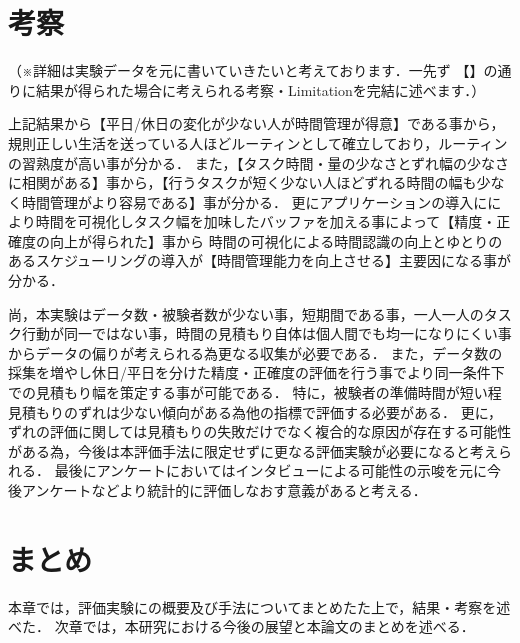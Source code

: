 
\section{考察}
（※詳細は実験データを元に書いていきたいと考えております．一先ず
【】の通りに結果が得られた場合に考えられる考察・Limitationを完結に述べます．）

上記結果から【平日/休日の変化が少ない人が時間管理が得意】である事から，規則正しい生活を送っている人ほどルーティンとして確立しており，ルーティンの習熟度が高い事が分かる．
また，【タスク時間・量の少なさとずれ幅の少なさに相関がある】事から，【行うタスクが短く少ない人ほどずれる時間の幅も少なく時間管理がより容易である】事が分かる．
更にアプリケーションの導入ににより時間を可視化しタスク幅を加味したバッファを加える事によって【精度・正確度の向上が得られた】事から
時間の可視化による時間認識の向上とゆとりのあるスケジューリングの導入が【時間管理能力を向上させる】主要因になる事が分かる．

尚，本実験はデータ数・被験者数が少ない事，短期間である事，一人一人のタスク行動が同一ではない事，時間の見積もり自体は個人間でも均一になりにくい事からデータの偏りが考えられる為更なる収集が必要である．
また，データ数の採集を増やし休日/平日を分けた精度・正確度の評価を行う事でより同一条件下での見積もり幅を策定する事が可能である．
特に，被験者の準備時間が短い程見積もりのずれは少ない傾向がある為他の指標で評価する必要がある．
更に，ずれの評価に関しては見積もりの失敗だけでなく複合的な原因が存在する可能性がある為，今後は本評価手法に限定せずに更なる評価実験が必要になると考えられる．
最後にアンケートにおいてはインタビューによる可能性の示唆を元に今後アンケートなどより統計的に評価しなおす意義があると考える．

\section{まとめ}
本章では，評価実験にの概要及び手法についてまとめたた上で，結果・考察を述べた．
次章では，本研究における今後の展望と本論文のまとめを述べる．
